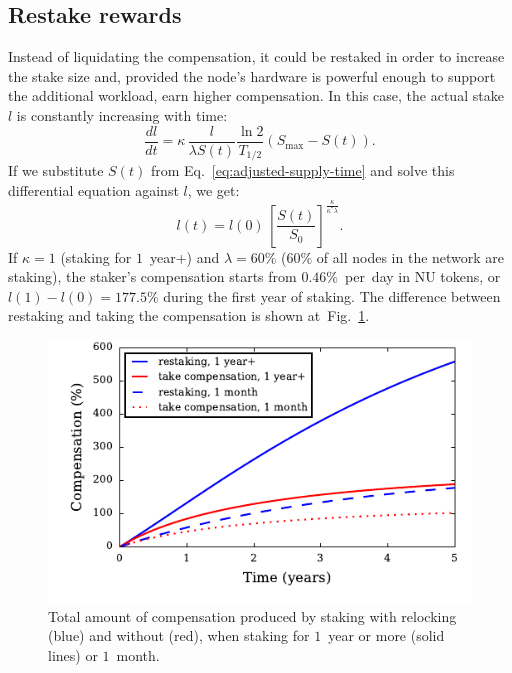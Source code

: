 \documentclass[longbibliography,nofootinbib,twocolumn]{revtex4-1}
\newcommand{\figref}[1]{Fig.~\ref{#1}}
\begin{document}
\subsection{Restake rewards}

Instead of liquidating the compensation, it could be restaked in order to increase the stake size and, provided the node's hardware is
powerful enough to support the additional workload, earn higher compensation.
In this case, the actual stake $l$ is constantly increasing with time:
\begin{equation}
    \frac{dl}{dt} =  \kappa\, \frac{l}{\lambda S(t)} \frac{\ln{2}}{T_{1/2}} \left( S_{\max} - S(t)\right).
\end{equation}
If we substitute $S(t)$ from Eq.~\ref{eq:adjusted-supply-time} and solve this differential equation against $l$, we get:
\begin{equation}
    l(t) = l(0)\,\left[ \frac{S(t)}{S_0} \right]^{\frac{\kappa}{\kappa^* \lambda}}.
\end{equation}
If $\kappa=1$ (staking for $1$~year+) and $\lambda=60\%$ ($60\%$ of all nodes in the network are staking),
the staker's compensation starts from $0.46\%$~per~day in NU tokens,
or $l(1) - l(0) = 177.5\%$ during the first year of staking.
The difference between restaking and taking the compensation is shown at~\figref{fig:total-compensation}.


\begin{figure}
    \includegraphics[width=\columnwidth]{pdf/total-compensation.pdf}
    \caption{Total amount of compensation produced by staking with relocking (blue) and without (red),
        when staking for $1$~year or more (solid lines) or $1$~month.}
    \label{fig:total-compensation}
\end{figure}
\end{document}
